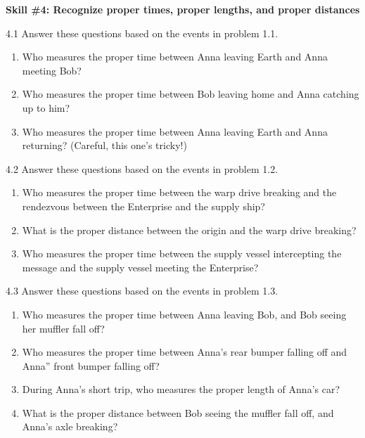 \pagebreak



\textbf{Skill \#4: Recognize proper times, proper lengths, and proper distances}

4.1 Answer these questions based on the events in problem 1.1.
\begin{enumerate}[nosep,label=(\emph{\alph*})]
\item Who measures the proper time between Anna leaving Earth and Anna meeting Bob?
\answerspace{0.3in}

\item Who measures the proper time between Bob leaving home and Anna catching up to him? 
\answerspace{0.3in}

\item Who measures the proper time between Anna leaving Earth and Anna returning?  (Careful, this one's tricky!)
\answerspace{0.3in}

\end{enumerate}
4.2 Answer these questions based on the events in problem 1.2.
\begin{enumerate}[nosep,label=(\emph{\alph*})]
\item Who measures the proper time between the warp drive breaking and the rendezvous between the Enterprise and the supply ship?
\answerspace{0.3in}

\item What is the proper distance between the origin and the warp drive breaking?
\answerspace{0.3in}

\item Who measures the proper time between the supply vessel intercepting the message and the supply vessel meeting the Enterprise?
\answerspace{0.3in}

\end{enumerate}

4.3 Answer these questions based on the events in problem 1.3.
\begin{enumerate}[nosep,label=(\emph{\alph*})]
\item Who measures the proper time between Anna leaving Bob, and Bob seeing her muffler fall off?  
\answerspace{0.3in}

\item Who measures the proper time between Anna's rear bumper falling off and Anna'' front bumper falling off?
\answerspace{0.3in}

\item During Anna's short trip, who measures the proper length of Anna's car?
\answerspace{0.3in}

\item What is the proper distance between Bob seeing the muffler fall off, and Anna's axle breaking?
\answerspace{0.3in}

\end{enumerate}

